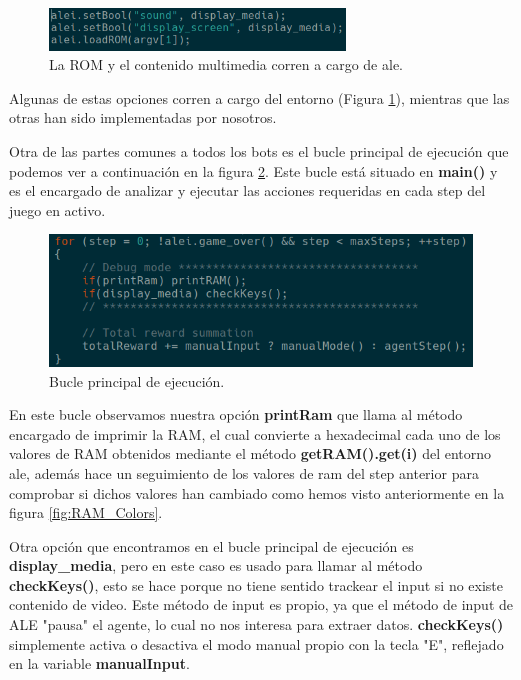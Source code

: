 \begin{figure}[h]
	\centering
	\includegraphics[width=0.7\textwidth]{Figures/ALEromANDmedia}
	\caption{La ROM y el contenido multimedia corren a cargo de \ac{ale}.}
	\label{fig:ALEromANDmedia}
\end{figure}

\newpage
Algunas de estas opciones corren a cargo del entorno (Figura 	\ref{fig:ALEromANDmedia}), mientras que las otras han sido implementadas por nosotros.

Otra de las partes comunes a todos los bots es el bucle principal de ejecución que podemos ver a continuación en la figura \ref{fig:ALEMainExecLoop}. Este bucle está situado en \textbf{main()} y es el encargado de analizar y ejecutar las acciones requeridas en cada step del juego en activo.

\begin{figure}[h]
	\centering
	\includegraphics[width=1\textwidth]{Figures/ALEMainExecLoop}
	\caption{Bucle principal de ejecución.}
	\label{fig:ALEMainExecLoop}
\end{figure}

En este bucle observamos nuestra opción \textbf{printRam} que llama al método encargado de imprimir la RAM, el cual convierte a hexadecimal cada uno de los valores de RAM obtenidos mediante el método \textbf{getRAM().get(i)} del entorno \ac{ale}, además hace un seguimiento de los valores de ram del step anterior para comprobar si dichos valores han cambiado como hemos visto anteriormente en la figura \ref{fig:RAM_Colors}.

Otra opción que encontramos en el bucle principal de ejecución es \textbf{display\_media}, pero en este caso es usado para llamar al método \textbf{checkKeys()}, esto se hace porque no tiene sentido trackear el input si no existe contenido de video. Este método de input es propio, ya que el método de input de ALE "pausa" el agente, lo cual no nos interesa para extraer datos. \textbf{checkKeys()} simplemente activa o desactiva el modo manual propio con la tecla "E", reflejado en la variable \textbf{manualInput}.

